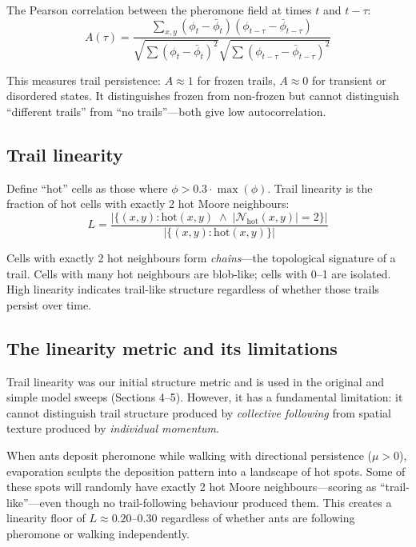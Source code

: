 \documentclass[11pt,a4paper]{article}
\begin{document}
The Pearson correlation between the pheromone field at times $t$ and $t - \tau$:
\begin{equation}
  A(\tau) = \frac{\sum_{x,y} (\phi_{t} - \bar\phi_{t})(\phi_{t-\tau} - \bar\phi_{t-\tau})}
                 {\sqrt{\sum(\phi_{t} - \bar\phi_{t})^2} \sqrt{\sum(\phi_{t-\tau} - \bar\phi_{t-\tau})^2}}
  \label{eq:autocorr}
\end{equation}

This measures trail persistence: $A \approx 1$ for frozen trails, $A \approx 0$ for transient or disordered states.
It distinguishes frozen from non-frozen but cannot distinguish ``different trails'' from ``no trails''---both give low autocorrelation.

\subsection{Trail linearity}

Define ``hot'' cells as those where $\phi > 0.3 \cdot \max(\phi)$.
Trail linearity is the fraction of hot cells with exactly 2 hot Moore neighbours:
\begin{equation}
  L = \frac{|\{(x,y) : \text{hot}(x,y) \;\wedge\; |\mathcal{N}_{\text{hot}}(x,y)| = 2\}|}{|\{(x,y) : \text{hot}(x,y)\}|}
  \label{eq:linearity}
\end{equation}

Cells with exactly 2 hot neighbours form \emph{chains}---the topological signature of a trail.
Cells with many hot neighbours are blob-like; cells with 0--1 are isolated.
High linearity indicates trail-like structure regardless of whether those trails persist over time.

\subsection{The linearity metric and its limitations}
\label{sec:linearity-problem}

Trail linearity was our initial structure metric and is used in the original and simple model sweeps (Sections 4--5).
However, it has a fundamental limitation: it cannot distinguish trail structure produced by \emph{collective following} from spatial texture produced by \emph{individual momentum}.

When ants deposit pheromone while walking with directional persistence ($\mu > 0$), evaporation sculpts the deposition pattern into a landscape of hot spots.
Some of these spots will randomly have exactly 2 hot Moore neighbours---scoring as ``trail-like''---even though no trail-following behaviour produced them.
This creates a linearity floor of $L \approx 0.20$--$0.30$ regardless of whether ants are following pheromone or walking independently.
\end{document}
